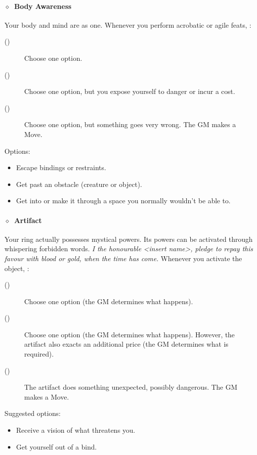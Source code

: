 \paragraph{\(\diamond\)~Body Awareness}%
Your body and mind are as one. Whenever you perform acrobatic or agile feats,
:
\begin{description}
 \item[()] Choose one option.
 \item[()] Choose one option, but you expose yourself to danger or incur a cost.
 \item[()] Choose one option, but something goes very wrong. The GM makes a Move.
\end{description}
\KULTrule%
Options:
\begin{itemize}
  \item Escape bindings or restraints.
  \item Get past an obstacle (creature or object).
  \item Get into or make it through a space you normally wouldn't be able to.
\end{itemize}
\KULTrule%

\paragraph{\(\diamond\)~Artifact}%
Your ring actually possesses mystical powers. Its powers can be activated through whispering forbidden words.
\textit{I the honourable <insert name>, pledge to repay this favour with blood or gold, when the time has come.}
Whenever you activate the object, :
\begin{description}
 \item[()] Choose one option (the GM determines what happens).
 \item[()] Choose one option (the GM determines what happens). However, the artifact also exacts an additional price (the GM determines what is required).
 \item[()] The artifact does something unexpected, possibly dangerous. The GM makes a Move.
\end{description}
\KULTrule%
Suggested options:
\begin{itemize}
\item Receive a vision of what threatens you.
\item Get yourself out of a bind.
\end{itemize}
\KULTrule%

